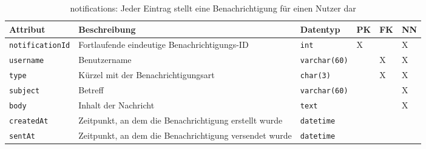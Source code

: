 \begin{table}[!ht]
	\caption{notifications: Jeder Eintrag stellt eine Benachrichtigung für einen Nutzer dar}
	\begin{tabular}{p{3cm}p{5cm}p{2cm}p{1cm}p{1cm}p{1cm}}
		\toprule 
		\textbf{Attribut} & \textbf{Beschreibung} & \textbf{Datentyp} & \textbf{PK} & \textbf{FK} & \textbf{NN} \\
		\hline 
		\texttt{notificationId} & Fortlaufende eindeutige Benachrichtigungs-ID & \texttt{int} & X & & X   \\
		\texttt{username} & Benutzername & \texttt{varchar(60)} & & X & X  \\
		\texttt{type} & Kürzel mit der Benachrichtigungsart & \texttt{char(3)} & & X & X  \\
		\texttt{subject} & Betreff & \texttt{varchar(60)} & & & X  \\
		\texttt{body} & Inhalt der Nachricht & \texttt{text} & & & X  \\
		\texttt{createdAt} & Zeitpunkt, an dem die Benachrichtigung erstellt wurde & \texttt{datetime} & & &  \\
		\texttt{sentAt} & Zeitpunkt, an dem die Benachrichtigung versendet wurde & \texttt{datetime} & & & \\
		\bottomrule
	\end{tabular}
\end{table}






